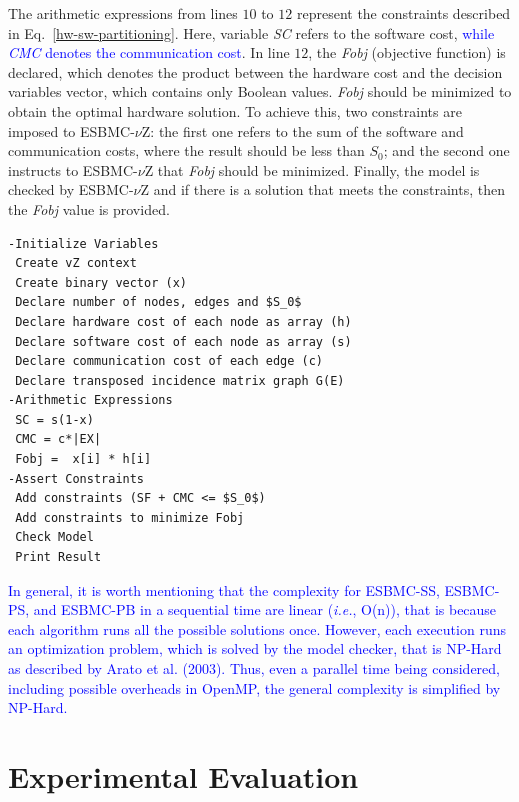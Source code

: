 \documentclass{doublecol-new}
\theoremstyle{TH}{
\newtheorem{lemma}{Lemma}
\newtheorem{theorem}[lemma]{Theorem}
\newtheorem{corrolary}[lemma]{Corrolary}
\newtheorem{conjecture}[lemma]{Conjecture}
\newtheorem{proposition}[lemma]{Proposition}
\newtheorem{claim}[lemma]{Claim}
\newtheorem{stheorem}[lemma]{Wrong Theorem}
\newtheorem{algorithm}{Algorithm}
}
\theoremstyle{THrm}{
\newtheorem{definition}{Definition}[section]
\newtheorem{question}{Question}[section]
\newtheorem{remark}{Remark}
\newtheorem{scheme}{Scheme}
}
\theoremstyle{THhit}{
\newtheorem{case}{Case}[section]
}
\begin{document}
The arithmetic expressions from lines $10$ to $12$ represent the constraints described in Eq.~\eqref{hw-sw-partitioning}. Here, variable \textit{SC} refers to the software cost, \textcolor{blue}{while \textit{CMC} denotes the communication cost}. In line $12$, the \textit{Fobj} (objective function) is declared, which denotes the product between the hardware cost and the decision variables vector, which contains only Boolean values. \textit{Fobj} should be minimized to obtain the optimal hardware solution. To achieve this, two constraints are imposed to ESBMC-$\nu$Z: the first one refers to the sum of the software and communication costs, where the result should be less than $S_0$; and the second one instructs to ESBMC-$\nu$Z that \textit{Fobj} should be minimized. Finally, the model is checked by ESBMC-$\nu$Z and if there is a solution that 
meets the constraints, then the \textit{Fobj} value is provided.

\begin{lstlisting}[basicstyle=\footnotesize,caption={Pseudocode describing ESBMC-$\nu$Z.},label={vZ-pseudocode},numbersep=7pt,frame=tb,captionpos=t,numberstyle=\tiny,mathescape=true]
-Initialize Variables
 Create vZ context 
 Create binary vector (x)
 Declare number of nodes, edges and $S_0$
 Declare hardware cost of each node as array (h) 
 Declare software cost of each node as array (s)
 Declare communication cost of each edge (c)
 Declare transposed incidence matrix graph G(E)
-Arithmetic Expressions
 SC = s(1-x)
 CMC = c*|EX|
 Fobj =  x[i] * h[i]
-Assert Constraints
 Add constraints (SF + CMC <= $S_0$)
 Add constraints to minimize Fobj
 Check Model
 Print Result
\end{lstlisting}

\textcolor{blue}{In general, it is worth mentioning that the complexity for ESBMC-SS, ESBMC-PS, and ESBMC-PB in a sequential time are linear (\textit{i.e.}, O(n)), that is because each algorithm runs all the possible solutions once. However, each execution runs an optimization problem, which is solved by the model checker, that is NP-Hard as described by Arato et al. (2003). Thus, even a parallel time being considered, including possible overheads in OpenMP, the general complexity is simplified by NP-Hard.}

\section{Experimental Evaluation}
\label{Experimental-Evaluation}
\end{document}

